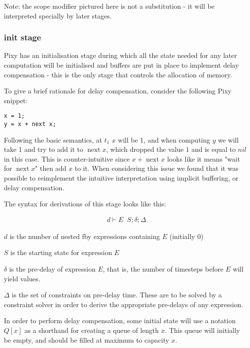 \documentclass{scrartcl}
\DeclareMathOperator{\nextop}{next}
\DeclareMathOperator{\initrel}{\overset{init}{\Rightarrow}}
\begin{document}
    Note: the scope modifier pictured here is not a substitution - it will be interpreted specially by later stages.
    
    \subsubsection{init stage}
    
    Pixy has an initialisation stage during which all the state needed for any later computation will be initialised and buffers are put in place to implement delay compensation - this is the only stage that controls the allocation of memory.
    
    To give a brief rationale for delay compensation, consider the following Pixy snippet:
    
    \begin{lstlisting}
x = 1;
y = x + next x;
    \end{lstlisting}
    
    Following the basic semantics, at $t_1$ $x$ will be 1, and when computing $y$ we will take 1 and try to add it to $\nextop x$, which dropped the value $1$ and is equal to $nil$ in this case. This is counter-intuitive since $x + \nextop x$ looks like it means "wait for $\nextop x$" then add $x$ to it. When considering this issue we found that it was possible to reimplement the intuitive interpretation using implicit buffering, or delay compensation.
    
    The syntax for derivations of this stage looks like this:
    
    \begin{align*}
    d \vdash E \initrel S; \delta; \Delta
    \end{align*}
    
    $d$ is the number of nested fby expressions containing $E$ (initially 0)
    
    $S$ is the starting state for expression $E$
    
    $\delta$ is the pre-delay of expression $E$, that is, the number of timesteps before $E$ will yield values.
    
    $\Delta$ is the set of constraints on pre-delay time. These are to be solved by a constraint solver in order to derive the appropriate pre-delays of any expression.
    
    In order to perform delay compensation, some initial state will use a notation $Q[x]$ as a shorthand for creating a queue of length $x$. This queue will initially be empty, and should be filled at maximum to capacity $x$.
    
\end{document}

